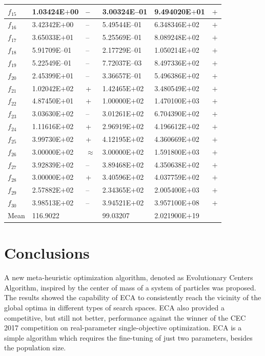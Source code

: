 \documentclass{svproc}
\begin{document}
\begin{table}[!ht]
{\begin{tabular}{p{1cm}p{3cm}p{0.5cm}p{3cm}p{2.5cm}p{1.0cm}}
		$f_{15}$ & 1.03424E$+$00  &  --  & 3.00324E--01 & 9.494020E$+$01 & $+$\\ \hline
		$f_{16}$ & 3.42342E$+$00  &  --  & 5.49544E--01 & 6.348346E$+$02 & $+$\\ \hline
		$f_{17}$ & 3.65033E$+$01  &  --  & 5.25569E--01 & 8.089248E$+$02 & $+$\\ \hline
		$f_{18}$ & 5.91709E--01  &  --  & 2.17729E--01 & 1.050214E$+$02 & $+$\\ \hline
		$f_{19}$ & 5.22549E--01  &  --  & 7.72037E--03 & 8.497336E$+$02 & $+$\\ \hline
		$f_{20}$ & 2.45399E$+$01  &  --  & 3.36657E--01 & 5.496386E$+$02 & $+$\\ \hline
		$f_{21}$ & 1.02042E$+$02  &  +  & 1.42465E$+$02 & 3.480549E$+$02 & $+$\\ \hline
		$f_{22}$ & 4.87450E$+$01  &  +  & 1.00000E$+$02 & 1.470100E$+$03 & $+$\\ \hline
		$f_{23}$ & 3.03630E$+$02  &  --  & 3.01261E$+$02 & 6.704390E$+$02 & $+$\\ \hline
		$f_{24}$ & 1.11616E$+$02  &  +  & 2.96919E$+$02 & 4.196612E$+$02 & $+$\\ \hline
		$f_{25}$ & 3.99730E$+$02  &  +  & 4.12195E$+$02 & 4.360669E$+$02 & $+$\\ \hline
		$f_{26}$ & 3.00000E$+$02  &  $\approx$  & 3.00000E$+$02 & 1.591800E$+$03 & $+$\\ \hline
		$f_{27}$ & 3.92839E$+$02  &  --  & 3.89468E$+$02 & 4.350638E$+$02 & $+$\\ \hline
		$f_{28}$ & 3.00000E$+$02  &  +  & 3.40596E$+$02 & 4.037759E$+$02 & $+$\\ \hline
		$f_{29}$ & 2.57882E$+$02  &  --  & 2.34365E$+$02 & 2.005400E$+$03 & $+$\\ \hline
		$f_{30}$ & 3.98513E$+$02  &  --  & 3.94521E$+$02 & 3.957100E$+$08 & $+$\\ \hline
			Mean & 116.9022       &       & 99.03207 &  2.021900E$+$19 \\ \hline
	\end{tabular}
}
\end{table}



\section{Conclusions} %
\label{sec:conclusions}

A new meta-heuristic optimization algorithm, denoted as Evolutionary Centers 
Algorithm, inspired by the center of mass of a system of particles was proposed. 
The results showed the capability of ECA to consistently reach the vicinity 
of the global optima in different types of search spaces. ECA also provided 
a competitive, but still not better, performance against the winner of the 
CEC 2017 competition on real-parameter single-objective optimization. ECA 
is a simple algorithm which requires the fine-tuning of just two parameters, 
besides the population size.\\
\end{document}
